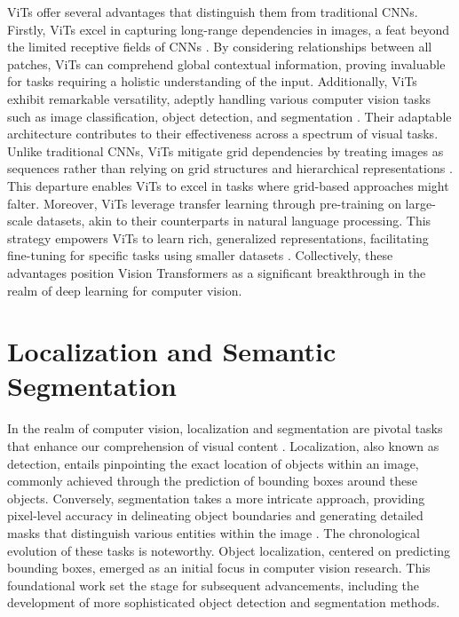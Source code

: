 ViTs offer several advantages that distinguish them from traditional CNNs. Firstly, ViTs excel in capturing long-range dependencies in images, a feat beyond the limited receptive fields of CNNs \cite{ghiasi2022vision}. By considering relationships between all patches, ViTs can comprehend global contextual information, proving invaluable for tasks requiring a holistic understanding of the input. Additionally, ViTs exhibit remarkable versatility, adeptly handling various computer vision tasks such as image classification, object detection, and segmentation \cite{qiang2023interpretabilityaware} \cite{su2021vitas}. Their adaptable architecture contributes to their effectiveness across a spectrum of visual tasks. Unlike traditional CNNs, ViTs mitigate grid dependencies by treating images as sequences rather than relying on grid structures and hierarchical representations \cite{khan2022transformers}. This departure enables ViTs to excel in tasks where grid-based approaches might falter. Moreover, ViTs leverage transfer learning through pre-training on large-scale datasets, akin to their counterparts in natural language processing. This strategy empowers ViTs to learn rich, generalized representations, facilitating fine-tuning for specific tasks using smaller datasets \cite{liu2021efficient}. Collectively, these advantages position Vision Transformers as a significant breakthrough in the realm of deep learning for computer vision.

  \section{Localization and Semantic Segmentation} \label{sec:s5}
  
In the realm of computer vision, localization and segmentation are pivotal tasks that enhance our comprehension of visual content \cite{huang2021vsnet}. Localization, also known as detection, entails pinpointing the exact location of objects within an image, commonly achieved through the prediction of bounding boxes around these objects. Conversely, segmentation takes a more intricate approach, providing pixel-level accuracy in delineating object boundaries and generating detailed masks that distinguish various entities within the image \cite{melaskyriazi2022deep}. The chronological evolution of these tasks is noteworthy. Object localization, centered on predicting bounding boxes, emerged as an initial focus in computer vision research. This foundational work set the stage for subsequent advancements, including the development of more sophisticated object detection and segmentation methods.

